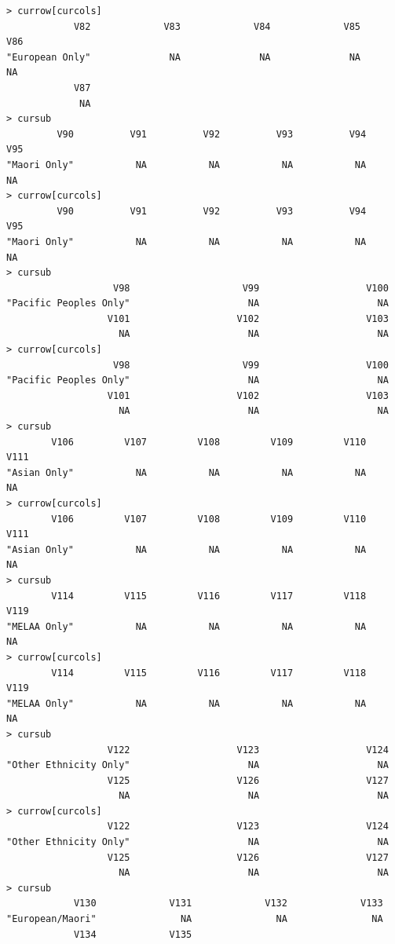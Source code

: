 \documentclass[a4paper]{article}
\begin{document}
\begin{verbatim}
> currow[curcols] 
            V82             V83             V84             V85             V86 
"European Only"              NA              NA              NA              NA 
            V87 
             NA 
> cursub 
         V90          V91          V92          V93          V94          V95 
"Maori Only"           NA           NA           NA           NA           NA 
> currow[curcols] 
         V90          V91          V92          V93          V94          V95 
"Maori Only"           NA           NA           NA           NA           NA 
> cursub 
                   V98                    V99                   V100 
"Pacific Peoples Only"                     NA                     NA 
                  V101                   V102                   V103 
                    NA                     NA                     NA 
> currow[curcols] 
                   V98                    V99                   V100 
"Pacific Peoples Only"                     NA                     NA 
                  V101                   V102                   V103 
                    NA                     NA                     NA 
> cursub 
        V106         V107         V108         V109         V110         V111 
"Asian Only"           NA           NA           NA           NA           NA 
> currow[curcols] 
        V106         V107         V108         V109         V110         V111 
"Asian Only"           NA           NA           NA           NA           NA 
> cursub 
        V114         V115         V116         V117         V118         V119 
"MELAA Only"           NA           NA           NA           NA           NA 
> currow[curcols] 
        V114         V115         V116         V117         V118         V119 
"MELAA Only"           NA           NA           NA           NA           NA 
> cursub 
                  V122                   V123                   V124 
"Other Ethnicity Only"                     NA                     NA 
                  V125                   V126                   V127 
                    NA                     NA                     NA 
> currow[curcols] 
                  V122                   V123                   V124 
"Other Ethnicity Only"                     NA                     NA 
                  V125                   V126                   V127 
                    NA                     NA                     NA 
> cursub 
            V130             V131             V132             V133 
"European/Maori"               NA               NA               NA 
            V134             V135 

\end{verbatim}
\end{document}

